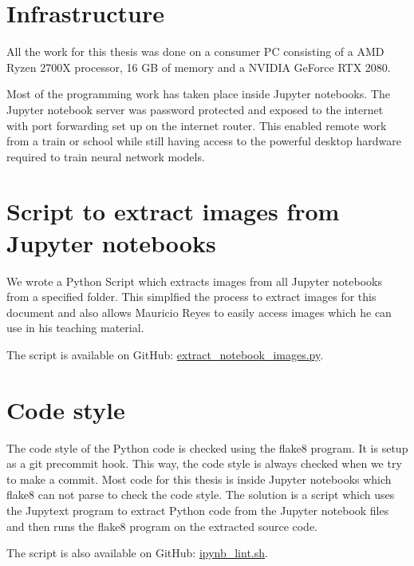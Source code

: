 \label{chapter_infrastructure}
\section{Infrastructure}
All the work for this thesis was done on a consumer PC consisting of a AMD Ryzen 2700X processor, 16 GB of memory and a NVIDIA GeForce RTX 2080.

Most of the programming work has taken place inside Jupyter notebooks. The Jupyter notebook server was password protected and exposed to the internet with port forwarding set up on the internet router. This enabled remote work from a train or school while still having access to the powerful desktop hardware required to train neural network models.

\section{Script to extract images from Jupyter notebooks}

We wrote a Python Script which extracts images from all Jupyter notebooks from a specified folder. This simplfied the process to extract images for this document and also allows Mauricio Reyes to easily access images which he can use in his teaching material.

The script is available on GitHub: \href{https://github.com/andef4/thesis-code/blob/master/extract_notebook_images.py}{extract\_notebook\_images.py}.

\section{Code style}
The code style of the Python code is checked using the flake8 program. It is setup as a git precommit hook. This way, the code style is always checked when we try to make a commit. Most code for this thesis is inside Jupyter notebooks which flake8 can not parse to check the code style. The solution is a script which uses the Jupytext \cite{jupytext} program to extract Python code from the Jupyter notebook files and then runs the flake8 program on the extracted source code.

The script is also available on GitHub: \href{https://github.com/andef4/thesis-code/blob/master/ipynb_lint.sh}{ipynb\_lint.sh}.
